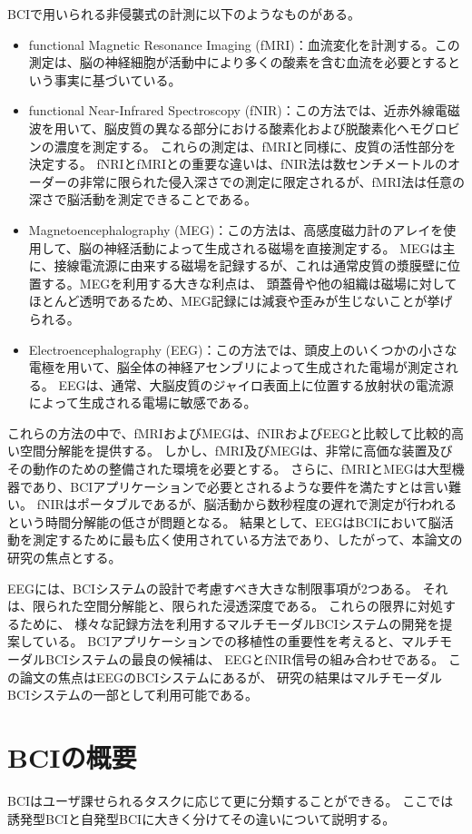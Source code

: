 BCIで用いられる非侵襲式の計測に以下のようなものがある。
\begin{itemize}
    \item functional Magnetic Resonance Imaging (fMRI)：血流変化を計測する。この測定は、脳の神経細胞が活動中により多くの酸素を含む血流を必要とするという事実に基づいている。
    \item functional Near-Infrared Spectroscopy (fNIR)：この方法では、近赤外線電磁波を用いて、脳皮質の異なる部分における酸素化および脱酸素化ヘモグロビンの濃度を測定する。
    これらの測定は、fMRIと同様に、皮質の活性部分を決定する。 
    fNRIとfMRIとの重要な違いは、fNIR法は数センチメートルのオーダーの非常に限られた侵入深さでの測定に限定されるが、fMRI法は任意の深さで脳活動を測定できることである。
    \item Magnetoencephalography (MEG)：この方法は、高感度磁力計のアレイを使用して、脳の神経活動によって生成される磁場を直接測定する。
    MEGは主に、接線電流源に由来する磁場を記録するが、これは通常皮質の漿膜壁に位置する。MEGを利用する大きな利点は、
    頭蓋骨や他の組織は磁場に対してほとんど透明であるため、MEG記録には減衰や歪みが生じないことが挙げられる。
    \item Electroencephalography (EEG)：この方法では、頭皮上のいくつかの小さな電極を用いて、脳全体の神経アセンブリによって生成された電場が測定される。
    EEGは、通常、大脳皮質のジャイロ表面上に位置する放射状の電流源によって生成される電場に敏感である。
\end{itemize}
これらの方法の中で、fMRIおよびMEGは、fNIRおよびEEGと比較して比較的高い空間分解能を提供する。
しかし、fMRI及びMEGは、非常に高価な装置及びその動作のための整備された環境を必要とする。
さらに、fMRIとMEGは大型機器であり、BCIアプリケーションで必要とされるような要件を満たすとは言い難い。
fNIRはポータブルであるが、脳活動から数秒程度の遅れで測定が行われるという時間分解能の低さが問題となる。
結果として、EEGはBCIにおいて脳活動を測定するために最も広く使用されている方法であり、したがって、本論文の研究の焦点とする。

EEGには、BCIシステムの設計で考慮すべき大きな制限事項が2つある。
それは、限られた空間分解能と、限られた浸透深度である。
これらの限界に対処するために、
様々な記録方法を利用するマルチモーダルBCIシステムの開発を提案している。
BCIアプリケーションでの移植性の重要性を考えると、マルチモーダルBCIシステムの最良の候補は、
EEGとfNIR信号の組み合わせである。
この論文の焦点はEEGのBCIシステムにあるが、
研究の結果はマルチモーダルBCIシステムの一部として利用可能である。

\section{BCIの概要}
BCIはユーザ課せられるタスクに応じて更に分類することができる。
ここでは誘発型BCIと自発型BCIに大きく分けてその違いについて説明する。
